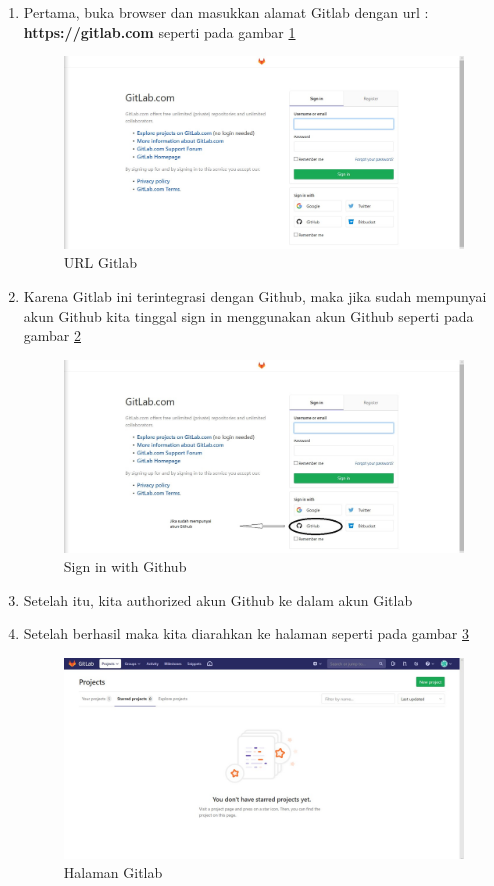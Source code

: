 \begin{enumerate}
\item Pertama, buka browser dan masukkan alamat Gitlab dengan url : \textbf{https://gitlab.com} seperti pada gambar \ref{urlgitlab}
\begin{figure}[!htbp]
\centerline{\includegraphics[width=.75\textwidth]{Figures/akunGit/gitlab1.jpg}}
\caption{URL Gitlab}
\label{urlgitlab}
\end{figure}

\item Karena Gitlab ini terintegrasi dengan Github, maka jika sudah mempunyai akun Github kita tinggal sign in menggunakan akun Github seperti pada gambar \ref{signingithub}
\begin{figure}[!htbp]
\centerline{\includegraphics[width=.75\textwidth]{Figures/akunGit/gitlab2.jpg}}
\caption{Sign in with Github}
\label{signingithub}
\end{figure}

\item Setelah itu, kita authorized akun Github ke dalam akun Gitlab

\item Setelah berhasil maka kita diarahkan ke halaman seperti pada gambar \ref{hlmgitlab}
\begin{figure}[!htbp]
\centerline{\includegraphics[width=.75\textwidth]{Figures/akunGit/gitlab3.jpg}}
\caption{Halaman Gitlab}
\label{hlmgitlab}
\end{figure}


\end{enumerate}
